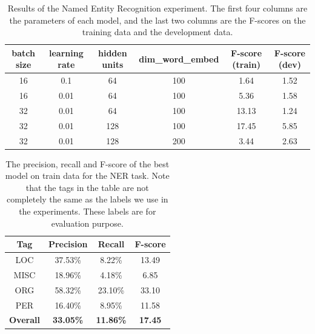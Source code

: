 \documentclass[11pt,a4paper]{article}
\begin{document}
% 
\begin{table}[]
\centering
\caption{Results of the Named Entity Recognition experiment. The first four columns are the parameters of each model, and the last two columns are the F-scores on the training data and the development data.}
\label{f1table}
\begin{tabular}{@{}cccc|cc@{}}
\toprule
batch size & learning rate & hidden units & dim\_word\_embed & F-score (train) & F-score (dev) \\ \midrule
16         & 0.1           & 64           & 100              & 1.64             & 1.52           \\
16         & 0.01          & 64           & 100              & 5.36             & 1.58           \\
32         & 0.01          & 64           & 100              & 13.13            & 1.24           \\
32         & 0.01          & 128          & 100              & 17.45            & 5.85           \\
32         & 0.01          & 128          & 200              & 3.44             & 2.63           \\ \bottomrule
\end{tabular}
\end{table}

\begin{table}[]
\centering
\caption{The precision, recall and F-score of the best model on train data for the NER task. Note that the tags in the table are not completely the same as the labels we use in the experiments. These labels are for evaluation purpose.}
\label{precision}
\begin{tabular}{@{}cccc@{}}
\toprule
Tag            & Precision        & Recall           & F-score       \\ \midrule
LOC              & 37.53\%          & 8.22\%           & 13.49          \\
MISC             & 18.96\%          & 4.18\%           & 6.85           \\
ORG              & 58.32\%          & 23.10\%          & 33.10          \\
PER              & 16.40\%          & 8.95\%           & 11.58          \\ \midrule
\textbf{Overall} & \textbf{33.05\%} & \textbf{11.86\%} & \textbf{17.45} \\ \bottomrule
\end{tabular}
\end{table}
\end{document}
